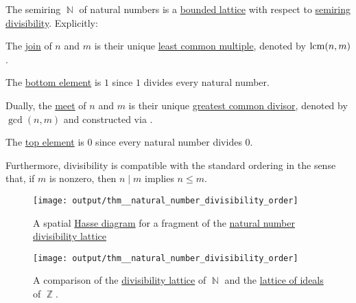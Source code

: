 \begin{proposition}\label{thm:natural_number_divisibility_lattice}
  The semiring \hyperref[def:natural_numbers]{\( \BbbN \)} of natural numbers is a \hyperref[def:extremal_points/bounds]{bounded lattice} with respect to \hyperref[def:divisibility]{semiring divisibility}. Explicitly:
  \begin{thmenum}
     The \hyperref[def:lattice/join]{join} of \( n \) and \( m \) is their unique \hyperref[def:lcm]{least common multiple}, denoted by \( \operatorname{lcm}(n, m) \).

     The \hyperref[def:extremal_points/top_and_bottom]{bottom element} is \( 1 \) since \( 1 \) divides every natural number.

     Dually, the \hyperref[def:lattice/meet]{meet} of \( n \) and \( m \) is their unique \hyperref[def:gcd]{greatest common divisor}, denoted by \( \gcd(n, m) \) and constructed via .

     The \hyperref[def:extremal_points/top_and_bottom]{top element} is \( 0 \) since every natural number divides \( 0 \).
  \end{thmenum}

  Furthermore, divisibility is compatible with the standard ordering in the sense that, if \( m \) is nonzero, then \( n \mid m \) implies \( n \leq m \).

  \begin{figure}[!ht]
    \centering
    \texttt{[image: output/thm\_\_natural\_number\_divisibility\_order]}
    \caption{A spatial \hyperref[def:hasse_diagram]{Hasse diagram} for a fragment of the \hyperref[thm:natural_number_divisibility_lattice]{natural number divisibility lattice}}
    \label{fig:thm:natural_number_divisibility_lattice/divisibility}
  \end{figure}

  \begin{figure}[!ht]
    \centering
    \texttt{[image: output/thm\_\_natural\_number\_divisibility\_order]}
    \caption{A comparison of the \hyperref[thm:natural_number_divisibility_lattice]{divisibility lattice} of \( \BbbN \) and the \hyperref[thm:semiring_of_ideals/lattice]{lattice of ideals} of \( \BbbZ \).}
    \label{fig:thm:natural_number_divisibility_lattice/ideals}
  \end{figure}
\end{proposition}
